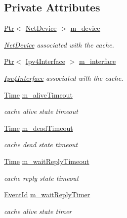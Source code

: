 \subsection*{Private Attributes}
\begin{DoxyCompactItemize}
\item 
\hyperlink{classns3_1_1Ptr}{Ptr}$<$ \hyperlink{classns3_1_1NetDevice}{Net\+Device} $>$ \hyperlink{classns3_1_1ArpCache_abeff23a1b2276b8cca9b3a023bce2850}{m\+\_\+device}
\begin{DoxyCompactList}\small\item\em \hyperlink{classns3_1_1NetDevice}{Net\+Device} associated with the cache. \end{DoxyCompactList}\item 
\hyperlink{classns3_1_1Ptr}{Ptr}$<$ \hyperlink{classns3_1_1Ipv4Interface}{Ipv4\+Interface} $>$ \hyperlink{classns3_1_1ArpCache_a51ac32b4e89fdfb85f0a30a5104f5857}{m\+\_\+interface}
\begin{DoxyCompactList}\small\item\em \hyperlink{classns3_1_1Ipv4Interface}{Ipv4\+Interface} associated with the cache. \end{DoxyCompactList}\item 
\hyperlink{classns3_1_1Time}{Time} \hyperlink{classns3_1_1ArpCache_a30dc0bd7f1b0fb5847a9df0db1d52add}{m\+\_\+alive\+Timeout}
\begin{DoxyCompactList}\small\item\em cache alive state timeout \end{DoxyCompactList}\item 
\hyperlink{classns3_1_1Time}{Time} \hyperlink{classns3_1_1ArpCache_a399aae557ff88496c35d5f6beb842923}{m\+\_\+dead\+Timeout}
\begin{DoxyCompactList}\small\item\em cache dead state timeout \end{DoxyCompactList}\item 
\hyperlink{classns3_1_1Time}{Time} \hyperlink{classns3_1_1ArpCache_a4369a983ccf79656dbe6066b5fe91814}{m\+\_\+wait\+Reply\+Timeout}
\begin{DoxyCompactList}\small\item\em cache reply state timeout \end{DoxyCompactList}\item 
\hyperlink{classns3_1_1EventId}{Event\+Id} \hyperlink{classns3_1_1ArpCache_a2725853dd931117b4d49b95b036f6d2b}{m\+\_\+wait\+Reply\+Timer}
\begin{DoxyCompactList}\small\item\em cache alive state timer \end{DoxyCompactList}\item 

\end{DoxyCompactItemize}
